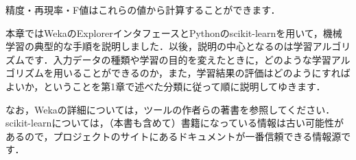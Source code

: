 精度・再現率・F値はこれらの値から計算することができます．


本章ではWekaのExplorerインタフェースとPythonのscikit-learnを用いて，機械学習の典型的な手順を説明しました．以後，説明の中心となるのは学習アルゴリズムです．入力データの種類や学習の目的を変えたときに，どのような学習アルゴリズムを用いることができるのか，また，学習結果の評価はどのようにすればよいか，ということを第1章で述べた分類に従って順に説明してゆきます．

なお，Wekaの詳細については，ツールの作者らの著書\cite{witten11}を参照してください．scikit-learnについては，（本書も含めて）書籍になっている情報は古い可能性があるので，プロジェクトのサイトにあるドキュメントが一番信頼できる情報源です．
